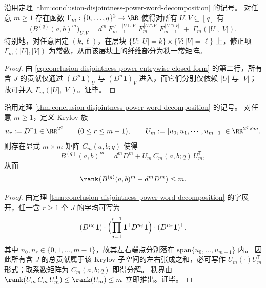 \begin{corollary}[层纤维分裂与交并信息的严格解耦]\label{cor:conclusion-disjointness-layer-fiber-decoupling}
沿用定理 \ref{thm:conclusion-disjointness-power-word-decomposition} 的记号。
对任意 \(m\ge 1\) 存在函数 \(\Gamma_m:\{0,\dots,q\}^2\to\RR\) 使得对所有 \(U,V\subseteq[q]\) 有
\[
\bigl(B^{(q)}(a,b)^m\bigr)_{U,V}
=
d^{m}\,F_{m+1}^{\,q-|U\cup V|}\,F_{m}^{\,|U\triangle V|}\,F_{m-1}^{\,|U\cap V|}
\;+\;\Gamma_m(|U|,|V|).
\]
特别地，对任意固定 \((k,\ell)\)，在层块 \(\{U:|U|=k\}\times\{V:|V|=\ell\}\) 上，修正项 \(\Gamma_m(|U|,|V|)\) 为常数，从而该层块上的纤维部分为秩一常矩阵。
\end{corollary}
\begin{proof}
由 \eqref{eq:conclusion-disjointness-power-entrywise-closed-form} 的第二行，所有含 \(J\) 的贡献仅通过 \((D^{n}\mathbf 1)_U\) 与 \((D^{n}\mathbf 1)_V\) 进入，而它们分别仅依赖 \(|U|\) 与 \(|V|\)；故可并入 \(\Gamma_m(|U|,|V|)\)。证毕。
\end{proof}

\begin{theorem}\label{thm:conclusion-disjointness-fixedm-krylov-lowrank}
沿用定理 \ref{thm:conclusion-disjointness-power-word-decomposition} 的记号。
对任意 \(m\ge 1\)，定义 Krylov 族
\[
u_r:=D^{r}\mathbf 1\in\RR^{2^q}\qquad (0\le r\le m-1),
\qquad
U_m:=[u_0,u_1,\cdots,u_{m-1}]\in\RR^{2^q\times m}.
\]
则存在显式 \(m\times m\) 矩阵 \(C_m(a,b;q)\) 使得
\[
B^{(q)}(a,b)^m=d^m D^m+U_m\,C_m(a,b;q)\,U_m^{\mathsf T},
\]
从而
\[
\rank\bigl(B^{(q)}(a,b)^m-d^mD^m\bigr)\le m.
\]
\end{theorem}
\begin{proof}
由定理 \ref{thm:conclusion-disjointness-power-word-decomposition} 的字展开，任一含 \(r\ge 1\) 个 \(J\) 的字均可写为
\[
(D^{n_0}\mathbf 1)\cdot \Bigl(\prod_{j=1}^{r-1}\mathbf 1^{\mathsf T}D^{n_j}\mathbf 1\Bigr)\cdot (D^{n_r}\mathbf 1)^{\mathsf T}.
\]
其中 \(n_0,n_r\in\{0,1,\dots,m-1\}\)，故其左右端点分别落在 \(\mathrm{span}\{u_0,\dots,u_{m-1}\}\) 内。
因此所有含 \(J\) 的总贡献属于该 Krylov 子空间的左右张成之和，必可写作 \(U_m(\cdot)U_m^{\mathsf T}\) 形式；取系数矩阵为 \(C_m(a,b;q)\) 即得分解。
秩界由 \(\rank(U_m\,C_m\,U_m^{\mathsf T})\le \rank(U_m)\le m\) 立即推出。证毕。
\end{proof}

